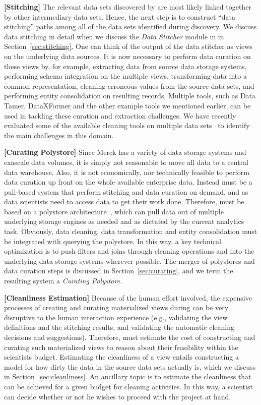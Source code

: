 {\bf[Stitching]} The relevant data sets discovered by \dcv  are most likely  linked together by other intermediary data sets.  Hence, the next step is to construct ``data stitching'' paths among all of the data sets identified during discovery.  We discuss data stitching in detail when we discuss the {\it Data Stitcher} module in \dcv in Section~\ref{sec:stitching}. One can think of the output of the data stitcher as views on the underlying data sources. It is now necessary to perform data curation on these views by, for example, extracting data from source data storage systems, performing schema integration on the multiple views, transforming data into a common representation, cleaning erroneous values from the source data sets, and performing entity consolidation on resulting records. Multiple tools, such as Data Tamer, DataXFormer and the other example tools we mentioned earlier, can be used in tackling these curation and extraction challenges. We have recently evaluated some of the available cleaning tools on multiple data sets~\cite{evaluatioin} to identify the main challenges in this domain.

{\bf[Curating Polystore]} Since Merck has a variety of data storage systems and exascale data volumes, it is simply not reasonable to move all data to a  central data warehouse. Also, it is not economically, nor technically feasible  to perform data curation up front on the whole available enterprise data. Instead \dcv  must be a pull-based  system that perform stitching and data curation on demand, and  as data scientists need to access data to get
their work done.  Therefore, \dcv must be based on a polystore architecture~\cite{DBLP:journals/sigmod/DugganESBHKMMMZ15}, which  can pull data out of multiple underlying storage engines as needed and as dictated by the current analytics task.  Obviously, data cleaning, data transformation and entity consolidation must be integrated with querying the polystore.  In this way, a key technical optimization is to push filters and joins through cleaning operations and into the underlying data storage systems wherever possible.  The
merger of polystores and data curation steps is discussed in Section~\ref{sec:curating}, and we term the resulting system a {\it Curating Polystore}.  

{\bf[Cleanliness Estimation]}  Because of the human effort involved, the expensive processes of creating and curating materialized views during can be very disruptive to the human interaction experience (e.g., validating the view definitions and the stitching results, and validating the automatic cleaning decisions and suggestions).  Therefore, \dcv must estimate the cost of constructing and curating such materialized views  to reason about their feasibility within the scientists budget.  Estimating the cleanliness of a view  entails constructing a model for how dirty the data in the source data sets actually is, which we discuss in Section~\ref{sec:cleanliness}. An ancillary topic is to estimate the cleanliness that can be achieved for a given budget for cleaning activities.  In this way, a scientist can decide
whether or not he wishes to proceed with the project at hand.

